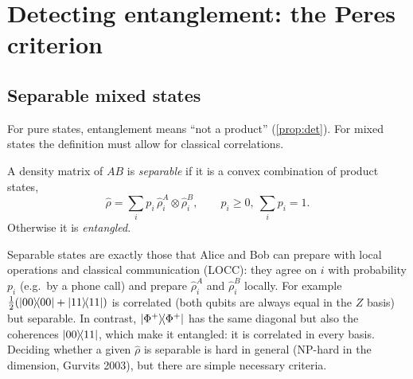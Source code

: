 \chapter{Detecting entanglement: the Peres criterion}\label{ch:peres}

\section{Separable mixed states}
For pure states, entanglement means ``not a product'' (\cref{prop:det}). For mixed states the definition must allow for classical correlations.
\begin{definition}[Werner, 1989]
A density matrix of $AB$ is \emph{separable} if it is a convex combination of product states,
\begin{equation}\label{eq:separable}
  \hat\rho=\sum_ip_i\,\hat\rho_i^A\otimes\hat\rho_i^B,\qquad p_i\ge0,\ \sum_ip_i=1.
\end{equation}
Otherwise it is \emph{entangled}.
\end{definition}
Separable states are exactly those that Alice and Bob can prepare with local operations and classical communication (LOCC): they agree on $i$ with probability $p_i$
(e.g.\ by a phone call) and prepare $\hat\rho_i^A$ and $\hat\rho_i^B$ locally. For example $\frac12(\left|00\middle\rangle\!\middle\langle00\right|+\left|11\middle\rangle\!\middle\langle11\right|)$ is correlated (both qubits are always equal in the
$Z$ basis) but separable. In contrast, $\left|\Phi^+\middle\rangle\!\middle\langle\Phi^+\right|$ has the same diagonal but also the coherences $\left|00\middle\rangle\!\middle\langle11\right|$, which make it entangled: it is correlated in
every basis. Deciding whether a given $\hat\rho$ is separable is hard in general (NP-hard in the dimension, Gurvits 2003), but there are simple necessary criteria.

